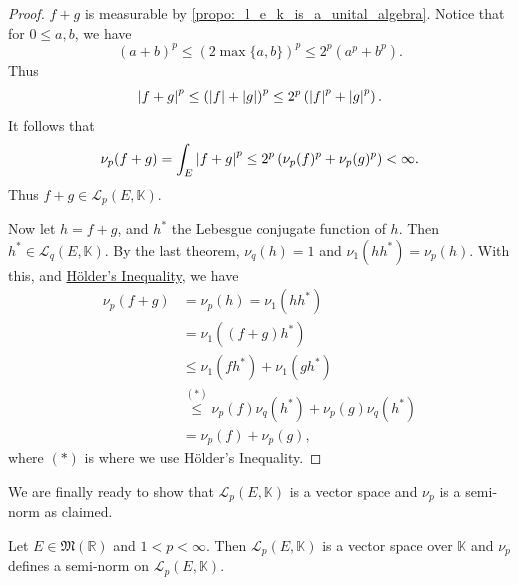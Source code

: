 \documentclass[notoc,notitlepage]{tufte-book}
\begin{document}
\begin{proof}
  $f + g$ is measurable by \cref{propo:_l_e_k_is_a_unital_algebra}. Notice that
  for $0 \leq a, b$, we have
  \begin{equation*}
    (a + b)^p \leq \left( 2 \max \{ a, b \} \right)^p \leq 2^p (a^p + b^p).
  \end{equation*}
  Thus
  \begin{equation*}
    \left|f + g\right|^p \leq \left( \left|f\right| + \left|g\right| \right)^p \leq 2^p \left(
    \left|f\right|^p + \left|g\right|^p \right).
  \end{equation*}
  It follows that
  \begin{equation*}
    \nu_p(f + g) = \int_{E} \left|f + g\right|^p \leq 2^p \left( \nu_p(f)^p +
    \nu_p(g)^p \right) < \infty.
  \end{equation*}
  Thus $f + g \in \mathcal{L}_p(E, \mathbb{K})$.

  Now let $h = f + g$, and $h^*$ the Lebesgue conjugate function of $h$. Then
  $h^* \in \mathcal{L}_q(E, \mathbb{K})$. By the last theorem, $\nu_q(h) = 1$ 
  and $\nu_1(hh^*) = \nu_p(h)$. With this, and
  \hyperref[thm:holders_inequality]{H\"{o}lder's Inequality}, we have
  \begin{align*}
    \nu_p(f + g) &= \nu_p(h) = \nu_1(hh^*) \\
                 &= \nu_1((f + g)h^*) \\
                 &\leq \nu_1(f h^*) + \nu_1(g h^*) \\
                 &\overset{(*)}{\leq} \nu_p(f) \nu_q(h^*) + \nu_p(g) \nu_q(h^*)
                 \\
                 &= \nu_p(f) + \nu_p(g),
  \end{align*}
  where $(*)$ is where we use H\"{o}lder's Inequality.
\end{proof}

We are finally ready to show that $\mathcal{L}_p (E, \mathbb{K})$ is a vector
space and $\nu_p$ is a semi-norm as claimed.

\begin{crly}\label{crly:_nu_p_is_a_semi_norm}
  Let $E \in \mathfrak{M}(\mathbb{R})$ and $1 < p < \infty$. Then
  $\mathcal{L}_p(E, \mathbb{K})$ is a vector space over $\mathbb{K}$ and
  $\nu_p$ defines a semi-norm on $\mathcal{L}_p(E, \mathbb{K})$.
\end{crly}
\end{document}
